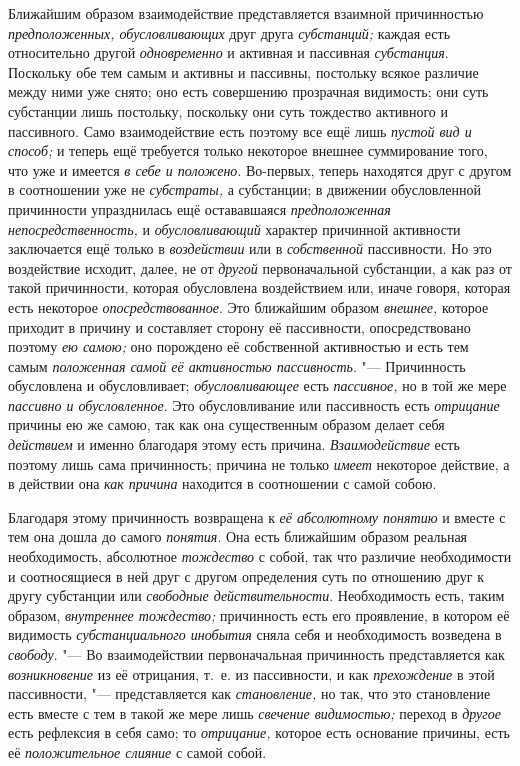 Ближайшим образом взаимодействие представляется взаимной причинностью
{\em предположенных, обусловливающих} друг друга
{\em субстанций;} каждая есть относительно другой
{\em одновременно} и активная и пассивная
{\em субстанция}. Поскольку обе тем самым и активны и
пассивны, постольку всякое различие между ними уже снято; оно есть
совершению прозрачная видимость; они суть субстанции лишь постольку,
поскольку они суть тождество активного и пассивного. Само взаимодействие
есть поэтому все ещё лишь {\em пустой вид и способ;} и
теперь ещё требуется только некоторое внешнее суммирование того, что уже и
имеется {\em в себе и положено}. Во-первых, теперь
находятся друг с другом в соотношении уже не
{\em субстраты,} а субстанции; в движении обусловленной
причинности упразднилась ещё остававшаяся
{\em предположенная непосредственность,} и
{\em обусловливающий} характер причинной активности
заключается ещё только в {\em воздействии} или в
{\em собственной} пассивности. Но это воздействие
исходит, далее, не от {\em другой} первоначальной
субстанции, а как раз от такой причинности, которая обусловлена
воздействием или, иначе говоря, которая есть некоторое
{\em опосредствованное}. Это ближайшим образом
{\em внешнее,} которое приходит в причину и составляет
сторону её пассивности, опосредствовано поэтому {\em ею
самою;} оно порождено её собственной активностью и есть тем самым
{\em положенная самой её активностью пассивность}. "---
Причинность обусловлена и обусловливает; {\em обусловливающее} есть
{\em пассивное,} но в той же мере
{\em пассивно и обусловленное}. Это обусловливание или
пассивность есть {\em отрицание} причины ею же самою,
так как она существенным образом делает себя
{\em действием} и именно благодаря этому есть причина.
{\em Взаимодействие} есть поэтому лишь сама
причинность; причина не только {\em имеет} некоторое
действие, а в действии она {\em как причина} находится
в соотношении с самой собою.

Благодаря этому причинность возвращена к {\em её
абсолютному понятию} и вместе с тем она дошла до самого
{\em понятия}. Она есть ближайшим образом реальная
необходимость, абсолютное {\em тождество} с собой, так
что различие необходимости и соотносящиеся в ней друг с другом определения
суть по отношению друг к другу субстанции или
{\em свободные действительности}. Необходимость есть,
таким образом, {\em внутреннее тождество;} причинность
есть его проявление, в котором её видимость
{\em субстанциального инобытия} сняла себя и
необходимость возведена в {\em свободу}. "--- Во
взаимодействии первоначальная причинность представляется как
{\em возникновение} из её отрицания, т.~е. из
пассивности, и как {\em прехождение} в этой
пассивности, "--- представляется как {\em становление,} но
так, что это становление есть вместе с тем в такой же мере лишь
{\em свечение видимостью;} переход в
{\em другое} есть рефлексия в себя само; то
{\em отрицание,} которое есть основание причины, есть
её {\em положительное слияние} с самой собой.

